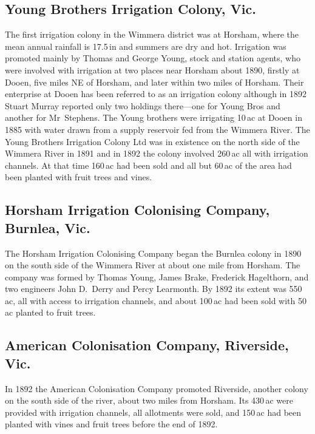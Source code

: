 \subsection*{Young Brothers Irrigation Colony, Vic.}

The first irrigation colony in the Wimmera district was at Horsham,
where the mean annual rainfall is 17.5\,in and summers are dry and
hot.  Irrigation was promoted mainly by Thomas and George Young, stock
and station agents, who were involved with irrigation at two places
near Horsham about 1890, firstly at Dooen, five miles NE of Horsham,
and later within two miles of Horsham.  Their enterprise at Dooen has
been referred to as an irrigation colony although in 1892 Stuart
Murray reported only two holdings there---one for Young Bros and
another for Mr~Stephens.  The Young brothers were irrigating 10\,ac at
Dooen in 1885 with water drawn from a supply reservoir fed from the
Wimmera River.  The Young Brothers Irrigation Colony Ltd
was in existence on the north side of the Wimmera River in 1891 and in
1892 the colony involved 260\,ac all with irrigation channels.  At
that time 160\,ac had been sold and all but 60\,ac of the area had
been planted with fruit trees and vines.

\subsection*{Horsham Irrigation Colonising Company, Burnlea, Vic.}

The Horsham Irrigation Colonising Company began the Burnlea colony in
1890 on the south side of the Wimmera River at about one mile from
Horsham.  The company was formed by Thomas Young, James Brake,
Frederick Hagelthorn, and two engineers John D.~Derry and Percy
Learmonth.  By 1892
its extent was 550\,ac, all with access to irrigation channels, and
about 100\,ac had been sold with 50\,ac planted to fruit
trees.

\subsection*{American Colonisation Company, Riverside, Vic.}

In 1892 the American Colonisation Company promoted Riverside, another
colony on the south side of the river, about two miles from Horsham.
Its 430\,ac were provided with irrigation channels, all allotments
were sold, and 150\,ac had been planted with vines and fruit trees
before the end of 1892.

